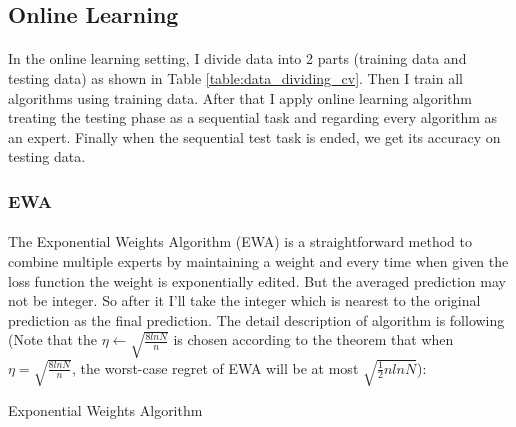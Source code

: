 \documentclass{gapd}
\begin{document}
\subsection{Online Learning}
\paragraph{}
	In the online learning setting, I divide data into 2 parts (training data and testing data) as shown in Table \ref{table:data_dividing_cv}. Then I train all algorithms using training data. After that I apply online learning algorithm treating the testing phase as a sequential task and regarding every algorithm as an expert. 
	Finally when the sequential test task is ended, we get its accuracy on testing data. 

\subsubsection{EWA}
\paragraph{}
	The Exponential Weights Algorithm (EWA) is a straightforward method to combine multiple experts by maintaining a weight and every time when given the loss function the weight is exponentially edited. But the averaged prediction may not be integer. So after it I'll take the integer which is nearest to the original prediction as the final prediction. The detail description of algorithm is following (Note that the $\eta \gets \sqrt{\frac{8lnN}{n}} $ is chosen according to the theorem that when $\eta = \sqrt{\frac{8lnN}{n}} $, the worst-case regret of EWA will be at most $\sqrt{\frac12nlnN}$): 

\begin{algorithm}
\caption{Exponential Weights Algorithm}
\label{algo:EWA}
\begin{algorithmic}
  \EndFor
\EndFor
\end{algorithmic}
\end{algorithm}
\end{document}
